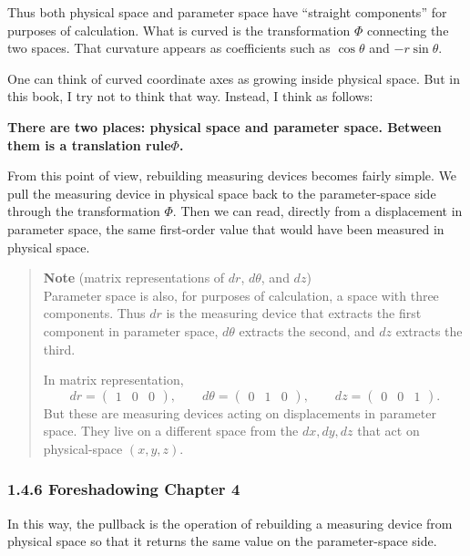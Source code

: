 Thus both physical space and parameter space have ``straight
components'' for purposes of calculation. What is curved is the
transformation \(\Phi\) connecting the two spaces. That curvature
appears as coefficients such as \(\cos\theta\) and \(-r\sin\theta\).

One can think of curved coordinate axes as growing inside physical
space. But in this book, I try not to think that way. Instead, I think
as follows:

\textbf{There are two places: physical space and parameter space. Between them is a translation rule}\(\Phi\)\textbf{.}

From this point of view, rebuilding measuring devices becomes fairly
simple. We pull the measuring device in physical space back to the
parameter-space side through the transformation \(\Phi\). Then we can
read, directly from a displacement in parameter space, the same
first-order value that would have been measured in physical space.

\begin{quote}
\textbf{Note} (matrix representations of \(dr\), \(d\theta\), and
\(dz\))\\
Parameter space is also, for purposes of calculation, a space with three
components. Thus \(dr\) is the measuring device that extracts the first
component in parameter space, \(d\theta\) extracts the second, and
\(dz\) extracts the third.

In matrix representation, \[
dr=\begin{pmatrix}1&0&0\end{pmatrix},\qquad
d\theta=\begin{pmatrix}0&1&0\end{pmatrix},\qquad
dz=\begin{pmatrix}0&0&1\end{pmatrix}.
\] But these are measuring devices acting on displacements in parameter
space. They live on a different space from the \(dx,dy,dz\) that act on
physical-space \((x,y,z)\).
\end{quote}

\hypertarget{foreshadowing-chapter-4}{%
\subsubsection{1.4.6 Foreshadowing Chapter
4}\label{foreshadowing-chapter-4}}

In this way, the pullback is the operation of rebuilding a measuring
device from physical space so that it returns the same value on the
parameter-space side.

